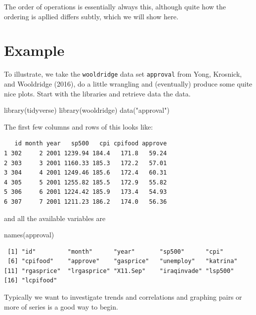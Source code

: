 \documentclass[
  letterpaper,
]{book}
\newenvironment{Shaded}{\begin{snugshade}}{\end{snugshade}}
\newcommand{\FunctionTok}[1]{\textcolor[rgb]{0.28,0.35,0.67}{#1}}
\newcommand{\NormalTok}[1]{\textcolor[rgb]{0.00,0.23,0.31}{#1}}
\newcommand{\StringTok}[1]{\textcolor[rgb]{0.13,0.47,0.30}{#1}}
\begin{document}
The order of operations is essentially always this, although quite how
the ordering is apllied differs subtly, which we will show here.

\hypertarget{example-3}{%
\section{Example}\label{example-3}}

To illustrate, we take the \texttt{wooldridge} data set
\texttt{approval} from Yong, Krosnick, and Wooldridge (2016), do a
little wrangling and (eventually) produce some quite nice plots. Start
with the libraries and retrieve data the data.

\begin{Shaded}
\begin{Highlighting}[]
\FunctionTok{library}\NormalTok{(tidyverse)}
\FunctionTok{library}\NormalTok{(wooldridge)}
\FunctionTok{data}\NormalTok{(}\StringTok{"approval"}\NormalTok{)}
\end{Highlighting}
\end{Shaded}

The first few columns and rows of this looks like:

\begin{verbatim}
   id month year   sp500   cpi cpifood approve
1 302     2 2001 1239.94 184.4   171.8   59.24
2 303     3 2001 1160.33 185.3   172.2   57.01
3 304     4 2001 1249.46 185.6   172.4   60.31
4 305     5 2001 1255.82 185.5   172.9   55.82
5 306     6 2001 1224.42 185.9   173.4   54.93
6 307     7 2001 1211.23 186.2   174.0   56.36
\end{verbatim}

and all the available variables are

\begin{Shaded}
\begin{Highlighting}[]
\FunctionTok{names}\NormalTok{(approval)}
\end{Highlighting}
\end{Shaded}

\begin{verbatim}
 [1] "id"         "month"      "year"       "sp500"      "cpi"       
 [6] "cpifood"    "approve"    "gasprice"   "unemploy"   "katrina"   
[11] "rgasprice"  "lrgasprice" "X11.Sep"    "iraqinvade" "lsp500"    
[16] "lcpifood"  
\end{verbatim}

Typically we want to investigate trends and correlations and graphing
pairs or more of series is a good way to begin.
\end{document}
